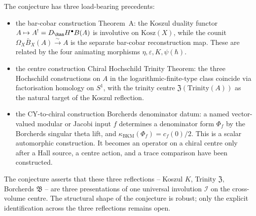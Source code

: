 \begin{remark}
\label{rem:universal-trace-identity-precedents}
The conjecture has three load-bearing precedents:
\begin{itemize}
 \item the bar-cobar construction Theorem~A: the Koszul duality functor
 $A \mapsto A^! = D_{\Ran}H^\bullet B(A)$ is involutive on
 $\mathrm{Kosz}(X)$, while the counit
 $\Omega_X\bar B_X(A)\xrightarrow{\sim}A$ is the separate bar-cobar
 reconstruction map. These are related by the four animating morphisms
 $\eta, \varepsilon, K, \psi(\hbar)$.
 \item the centre construction Chiral Hochschild Trinity Theorem: the three Hochschild
 constructions on $A$ in the logarithmic-finite-type class coincide
 via factorisation homology on $S^1$, with the trinity centre
 $\mathfrak{Z}(\mathrm{Trinity}(A))$ as the natural target of the
 Koszul reflection.
 \item the CY-to-chiral construction Borcherds denominator datum: a
 named vector-valued modular or Jacobi input \(f\) determines a
 denominator form \(\Phi_f\) by the Borcherds singular theta lift, and
 \(\kappa_{\mathrm{BKM}}(\Phi_f)=c_f(0)/2\).  This is a scalar
 automorphic construction.  It becomes an operator on a chiral centre
 only after a Hall source, a centre action, and a trace comparison have
 been constructed.
\end{itemize}
The conjecture asserts that these three reflections -- Koszul $K$,
Trinity $\mathfrak{Z}$, Borcherds $\mathfrak{B}$ -- are three presentations
of one universal involution $\mathcal{I}$ on the cross-volume centre.
The structural shape of the conjecture is robust; only the explicit
identification across the three reflections remains open.
\end{remark}


